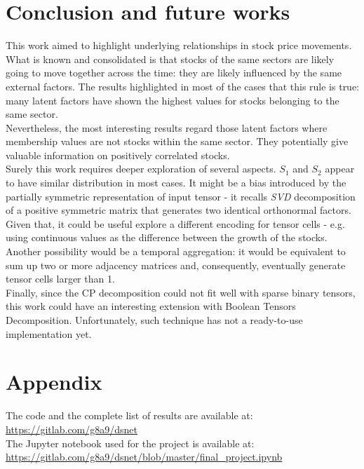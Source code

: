\documentclass[12pt]{extarticle}
\begin{document}
\section{Conclusion and future works}

This work aimed to highlight underlying relationships in stock price movements. What is known and consolidated is that stocks of the same sectors are likely going to move together across the time: they are likely influenced by the same external factors. The results highlighted in most of the cases that this rule is true: many latent factors have shown the highest values for stocks belonging to the same sector.\\
Nevertheless, the most interesting results regard those latent factors where membership values are not stocks within the same sector. They potentially give valuable information on positively correlated stocks.\\
Surely this work requires deeper exploration of several aspects. $S_1$ and $S_2$ appear to have similar distribution in most cases. It might be a bias introduced by the partially symmetric representation of input tensor - it recalls \textit{SVD} decomposition of a positive symmetric matrix that generates two identical orthonormal factors. Given that, it could be useful explore a different encoding for tensor cells - e.g. using continuous values as the difference between the growth of the stocks. Another possibility would be a temporal aggregation: it would be equivalent to sum up two or more adjacency matrices and, consequently, eventually generate tensor cells larger than 1.\\
Finally, since the CP decomposition could not fit well with sparse binary tensors, this work could have an interesting extension with Boolean Tensors Decomposition. Unfortunately, such technique has not a ready-to-use implementation yet.

\section{Appendix}

The code and the complete list of results are available at:\\ \href{https://gitlab.com/g8a9/dsnet}{https://gitlab.com/g8a9/dsnet}\\
The Jupyter notebook used for the project is available at:\\
\href{https://gitlab.com/g8a9/dsnet/blob/master/final_project.ipynb}{https://gitlab.com/g8a9/dsnet/blob/master/final\_project.ipynb}



\end{document}
